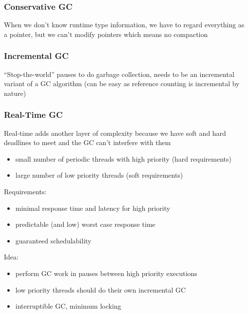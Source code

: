 \documentclass[]{article}
\theoremstyle{definition}
\begin{document}
	\subsubsection{Conservative GC}
	When we don't know runtime type information, we have to regard everything as a pointer, but we can't modify pointers which means no compaction

	\subsubsection{Incremental GC}
	``Stop-the-world'' pauses to do garbage collection, needs to be an incremental variant of a GC algorithm (can be easy as reference counting is incremental by nature)

	\subsubsection{Real-Time GC}
	Real-time adds another layer of complexity because we have soft and hard deadlines to meet and the GC can't interfere with them
	\begin{itemize}
		\item small number of periodic threads with high priority (hard requirements)
		\item large number of low priority threads (soft requirements)
	\end{itemize}

	Requirements:
	\begin{itemize}
		\item minimal response time and latency for high priority
		\item predictable (and low) worst case response time
		\item guaranteed schedulability
	\end{itemize}

	Idea:
	\begin{itemize}
		\item perform GC work in pauses between high priority executions
		\item low priority threads should do their own incremental GC
		\item interruptible GC, minimum locking
	\end{itemize}
\end{document}
